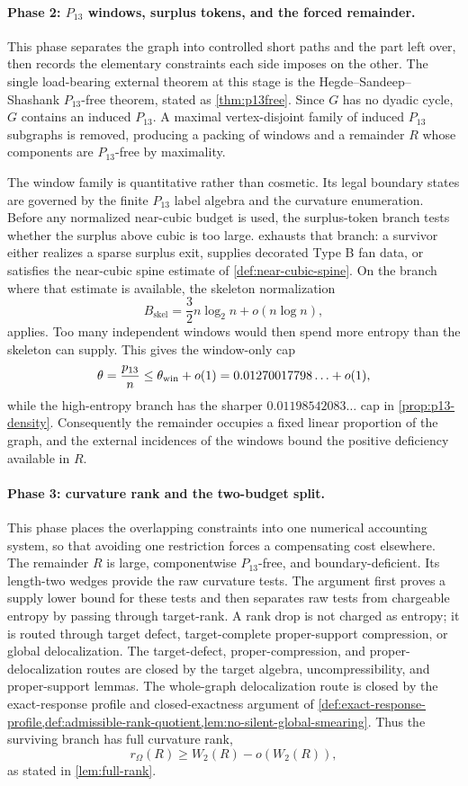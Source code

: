 \documentclass[11pt]{article}
\begin{document}
\paragraph{Phase 2: $P_{13}$ windows, surplus tokens, and the forced remainder.}
This phase separates the graph into controlled short paths and the part left
over, then records the elementary constraints each side imposes on the other.
The single load-bearing external theorem at this stage is the Hegde--Sandeep--Shashank
$P_{13}$-free theorem, stated as \cref{thm:p13free}.  Since $G$ has no dyadic
cycle, $G$ contains an induced $P_{13}$.  A maximal vertex-disjoint family of
induced $P_{13}$ subgraphs is removed, producing a packing of windows and a
remainder $R$ whose components are $P_{13}$-free by maximality.

The window family is quantitative rather than cosmetic.  Its legal boundary
states are governed by the finite $P_{13}$ label algebra and the curvature
enumeration.  Before any normalized near-cubic budget is used, the
surplus-token branch tests whether the surplus above cubic is too large.
 exhausts that branch: a
survivor either realizes a sparse surplus exit, supplies decorated Type B fan
data, or satisfies the near-cubic spine estimate of
\cref{def:near-cubic-spine}.  On the branch where that estimate is available,
the skeleton normalization
\[
B_{\mathrm{skel}}=\frac32 n\log_2 n+o(n\log n),
\]
applies.  Too many independent windows would then spend more entropy than the
skeleton can supply.  This gives the window-only cap
\[
\theta=\frac{p_{13}}{n}\le \theta_{\rm win}+o(1)
=0.01270017798\ldots+o(1),
\]
while the high-entropy branch has the sharper
$0.01198542083\ldots$ cap in \cref{prop:p13-density}.  Consequently the
remainder occupies a fixed linear proportion of the graph, and the external
incidences of the windows bound the positive deficiency available in $R$.

\paragraph{Phase 3: curvature rank and the two-budget split.}
This phase places the overlapping constraints into one numerical accounting
system, so that avoiding one restriction forces a compensating cost elsewhere.
The remainder $R$ is large, componentwise $P_{13}$-free, and boundary-deficient.
Its length-two wedges provide the raw curvature tests.  The argument first
proves a supply lower bound for these tests and then separates raw tests from
chargeable entropy by passing through target-rank.  A rank drop is not charged
as entropy; it is routed through target defect, target-complete proper-support
compression, or global delocalization.  The target-defect, proper-compression,
and proper-delocalization routes are closed by the target algebra,
uncompressibility, and proper-support lemmas.  The whole-graph delocalization
route is closed by the exact-response profile and closed-exactness argument of
\cref{def:exact-response-profile,def:admissible-rank-quotient,lem:no-silent-global-smearing}.
Thus the surviving branch has full curvature rank,
\[
r_\Omega(R)\ge W_2(R)-o(W_2(R)),
\]
as stated in \cref{lem:full-rank}.
\end{document}
